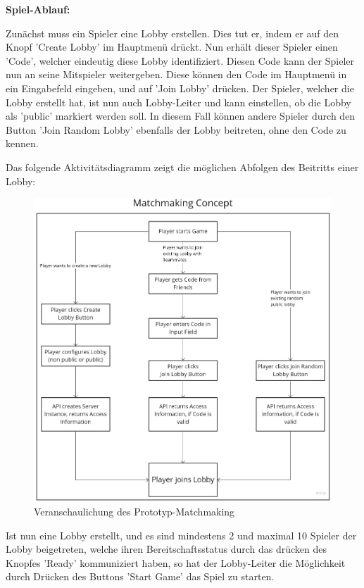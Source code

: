 \textbf{Spiel-Ablauf:}

Zunächst muss ein Spieler eine Lobby erstellen. Dies tut er, indem er auf den Knopf 'Create Lobby' im Hauptmenü drückt. Nun erhält dieser Spieler einen 'Code', welcher eindeutig diese Lobby identifiziert. Diesen Code kann der Spieler nun an seine Mitspieler weitergeben. Diese können den Code im Hauptmenü in ein Eingabefeld eingeben, und auf 'Join Lobby' drücken. Der Spieler, welcher die Lobby erstellt hat, ist nun auch Lobby-Leiter und kann einstellen, ob die Lobby als 'public' markiert werden soll. In diesem Fall können andere Spieler durch den Button 'Join Random Lobby' ebenfalls der Lobby beitreten, ohne den Code zu kennen. 

Das folgende Aktivitätsdiagramm zeigt die möglichen Abfolgen des Beitritts einer Lobby:

\begin{figure}[H]
	\centering
	\includegraphics[width=150mm]{images/matchmaking_concept.jpg}
	\caption[Matchmaking-Konzept Diagramm]{Veranschaulichung des Prototyp-Matchmaking}
	\label{pic:matchmaking_concept}
\end{figure}

Ist nun eine Lobby erstellt, und es sind mindestens 2 und maximal 10 Spieler der Lobby beigetreten, welche ihren Bereitschaftsstatus durch das drücken des Knopfes 'Ready' kommuniziert haben, so hat der Lobby-Leiter die Möglichkeit durch Drücken des Buttons 'Start Game' das Spiel zu starten.

